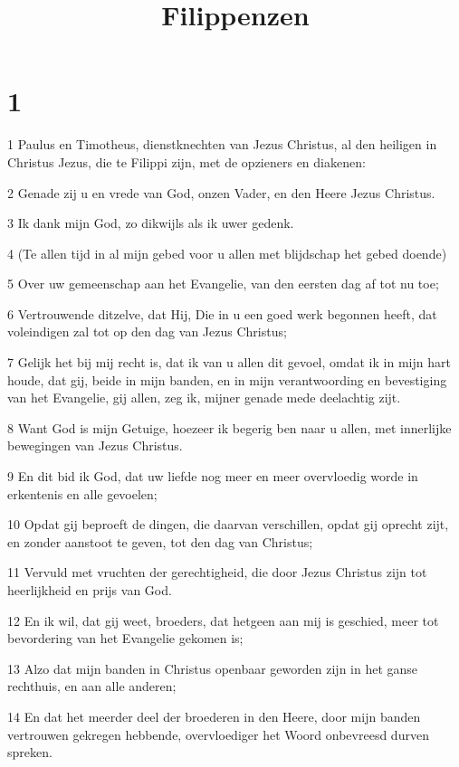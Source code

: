 

\title{Filippenzen}



\chapter{1}

\par 1 Paulus en Timotheus, dienstknechten van Jezus Christus, al den heiligen in Christus Jezus, die te Filippi zijn, met de opzieners en diakenen:
\par 2 Genade zij u en vrede van God, onzen Vader, en den Heere Jezus Christus.
\par 3 Ik dank mijn God, zo dikwijls als ik uwer gedenk.
\par 4 (Te allen tijd in al mijn gebed voor u allen met blijdschap het gebed doende)
\par 5 Over uw gemeenschap aan het Evangelie, van den eersten dag af tot nu toe;
\par 6 Vertrouwende ditzelve, dat Hij, Die in u een goed werk begonnen heeft, dat voleindigen zal tot op den dag van Jezus Christus;
\par 7 Gelijk het bij mij recht is, dat ik van u allen dit gevoel, omdat ik in mijn hart houde, dat gij, beide in mijn banden, en in mijn verantwoording en bevestiging van het Evangelie, gij allen, zeg ik, mijner genade mede deelachtig zijt.
\par 8 Want God is mijn Getuige, hoezeer ik begerig ben naar u allen, met innerlijke bewegingen van Jezus Christus.
\par 9 En dit bid ik God, dat uw liefde nog meer en meer overvloedig worde in erkentenis en alle gevoelen;
\par 10 Opdat gij beproeft de dingen, die daarvan verschillen, opdat gij oprecht zijt, en zonder aanstoot te geven, tot den dag van Christus;
\par 11 Vervuld met vruchten der gerechtigheid, die door Jezus Christus zijn tot heerlijkheid en prijs van God.
\par 12 En ik wil, dat gij weet, broeders, dat hetgeen aan mij is geschied, meer tot bevordering van het Evangelie gekomen is;
\par 13 Alzo dat mijn banden in Christus openbaar geworden zijn in het ganse rechthuis, en aan alle anderen;
\par 14 En dat het meerder deel der broederen in den Heere, door mijn banden vertrouwen gekregen hebbende, overvloediger het Woord onbevreesd durven spreken.
